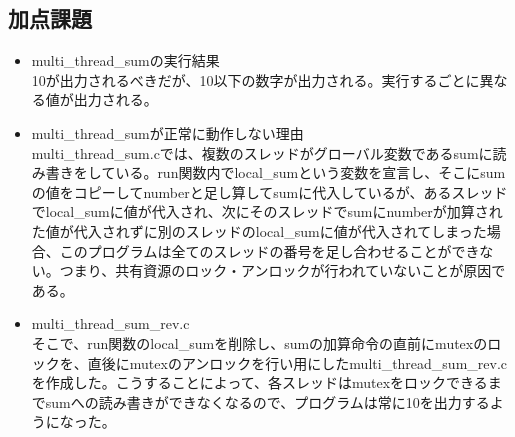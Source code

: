 \documentclass[a4j]{celb-report}
\begin{document}
\subsection{加点課題}
\begin{itemize}
 \item multi\_thread\_sumの実行結果\\
10が出力されるべきだが、10以下の数字が出力される。実行するごとに異なる値が出力される。
 \item multi\_thread\_sumが正常に動作しない理由\\
multi\_thread\_sum.cでは、複数のスレッドがグローバル変数であるsumに読み書きをしている。run関数内でlocal\_sumという変数を宣言し、そこにsumの値をコピーしてnumberと足し算してsumに代入しているが、あるスレッドでlocal\_sumに値が代入され、次にそのスレッドでsumにnumberが加算された値が代入されずに別のスレッドのlocal\_sumに値が代入されてしまった場合、このプログラムは全てのスレッドの番号を足し合わせることができない。つまり、共有資源のロック・アンロックが行われていないことが原因である。
 \item multi\_thread\_sum\_rev.c\\
そこで、run関数のlocal\_sumを削除し、sumの加算命令の直前にmutexのロックを、直後にmutexのアンロックを行い用にしたmulti\_thread\_sum\_rev.cを作成した。こうすることによって、各スレッドはmutexをロックできるまでsumへの読み書きができなくなるので、プログラムは常に10を出力するようになった。
\end{itemize}
\end{document}
